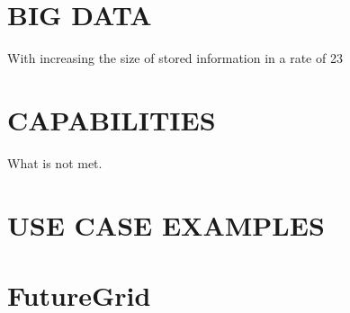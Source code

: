 \documentclass{sig-alternate}
\begin{document}
\section{BIG DATA}

With increasing the size of stored information in a rate of 23%

\section{CAPABILITIES}

What is not met.

\section{USE CASE EXAMPLES}

\section{FutureGrid}
\end{document}
